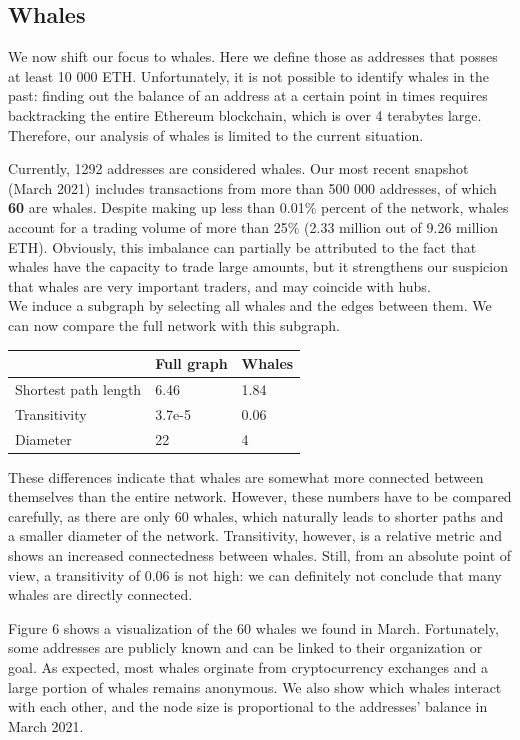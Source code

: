 \documentclass[10pt,a4paper]{article}
\begin{document}
\begin{multicols}{2}
\subsection{Whales}
We now shift our focus to whales. Here we define those as addresses that posses at least 10 000 ETH. Unfortunately, it is not possible to identify whales in the past: finding out the balance of an address at a certain point in times requires backtracking the entire Ethereum blockchain, which is over 4 terabytes large. Therefore, our analysis of whales is limited to the current situation.

Currently, 1292 addresses are considered whales. Our most recent snapshot (March 2021) includes transactions from more than 500 000 addresses, of which \textbf{60} are whales. Despite making up less than 0.01\% percent of the network, whales account for a trading volume of more than 25\% (2.33 million out of 9.26 million ETH). Obviously, this imbalance can partially be attributed to the fact that whales have the capacity to trade large amounts, but it strengthens our suspicion that whales are very important traders, and may coincide with hubs.\\

We induce a subgraph by selecting all whales and the edges between them. We can now compare the full network with this subgraph.

\bgroup
\def\arraystretch{1.5}
\begin{tabular}{p{}|p{}|p{}}
 & \textbf{Full graph} & \textbf{Whales} \\ 
\hline 
Shortest path length & 6.46 & 1.84 \\
Transitivity & 3.7e-5 & 0.06\\
Diameter & 22 & 4 \\
\end{tabular}
\egroup
\vspace{5pt}

These differences indicate that whales are somewhat more connected between themselves than the entire network. However, these numbers have to be compared carefully, as there are only 60 whales, which naturally leads to shorter paths and a smaller diameter of the network. Transitivity, however, is a relative metric and shows an increased connectedness between whales. Still, from an absolute point of view, a transitivity of 0.06 is not high: we can definitely not conclude that many whales are directly connected.

Figure 6 shows a visualization of the 60 whales we found in March. Fortunately, some addresses are publicly known and can be linked to their organization or goal. As expected, most whales orginate from cryptocurrency exchanges and a large portion of whales remains anonymous. We also show which whales interact with each other, and the node size is proportional to the addresses' balance in March 2021. 


\end{multicols}
\end{document}
